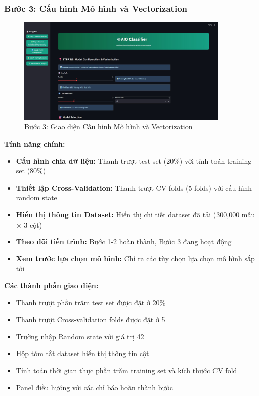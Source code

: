 \subsubsection{Bước 3: Cấu hình Mô hình và Vectorization}

\begin{figure}[H]
    \centering
    \includegraphics[width=0.9\textwidth]{image/Step 3.jpg}
    \caption{Bước 3: Giao diện Cấu hình Mô hình và Vectorization}
    \label{fig:step3}
\end{figure}

\textbf{Tính năng chính:}
\begin{itemize}
    \item \textbf{Cấu hình chia dữ liệu:} Thanh trượt test set (20\%) với tính toán training set (80\%)
    \item \textbf{Thiết lập Cross-Validation:} Thanh trượt CV folds (5 folds) với cấu hình random state
    \item \textbf{Hiển thị thông tin Dataset:} Hiển thị chi tiết dataset đã tải (300,000 mẫu × 3 cột)
    \item \textbf{Theo dõi tiến trình:} Bước 1-2 hoàn thành, Bước 3 đang hoạt động
    \item \textbf{Xem trước lựa chọn mô hình:} Chỉ ra các tùy chọn lựa chọn mô hình sắp tới
\end{itemize}

\textbf{Các thành phần giao diện:}
\begin{itemize}
    \item Thanh trượt phần trăm test set được đặt ở 20\%
    \item Thanh trượt Cross-validation folds được đặt ở 5
    \item Trường nhập Random state với giá trị 42
    \item Hộp tóm tắt dataset hiển thị thông tin cột
    \item Tính toán thời gian thực phần trăm training set và kích thước CV fold
    \item Panel điều hướng với các chỉ báo hoàn thành bước
\end{itemize}

